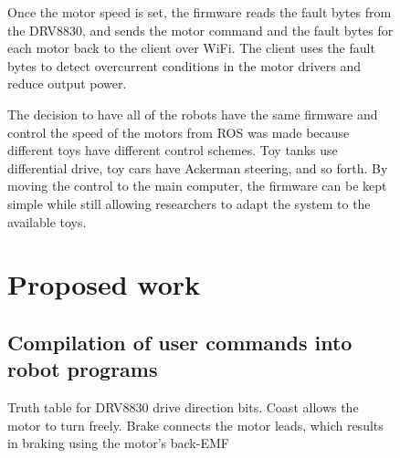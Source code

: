 \begin{figure}
{{\begin{table}
	\caption{Truth table for DRV8830 drive direction bits. Coast allows the motor to turn freely. Brake connects the motor leads, which results in braking using the motor's back-EMF}
	\label{tab:DRV8830_truth}
\end{table}

Once the motor speed is set, the firmware reads the fault bytes from the DRV8830, and sends the motor command and the fault bytes for each motor back to the client over WiFi. 
The client uses the fault bytes to detect overcurrent conditions in the motor drivers and reduce output power. 

The decision to have all of the robots have the same firmware and control the speed of the motors from ROS was made because different toys have different control schemes. 
Toy tanks use differential drive, toy cars have Ackerman steering, and so forth. 
By moving the control to the main computer, the firmware can be kept simple while still allowing researchers to adapt the system to the available toys.


		
\section{Proposed work}


\subsection{Compilation of user commands into robot programs}

}}
\end{figure}
